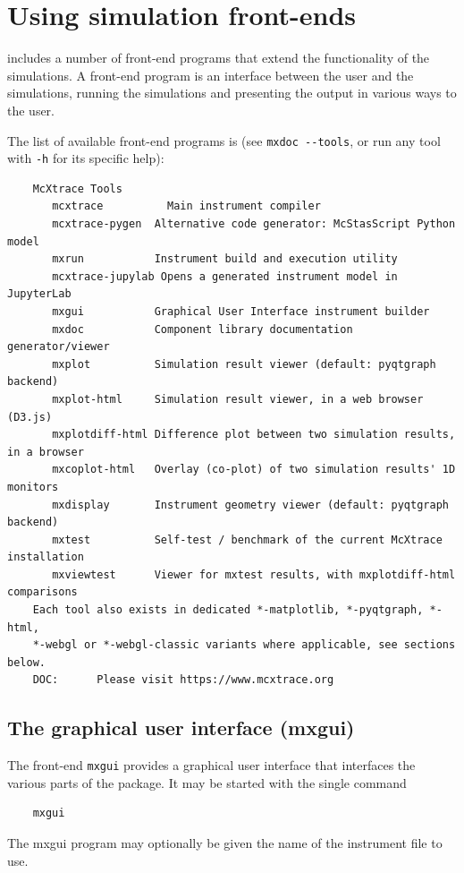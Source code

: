 \section{Using simulation front-ends}
\label{s:frontends}

\MCX includes a number of front-end programs that extend the
functionality of the simulations. A front-end program is an interface
between the user and the simulations, running the simulations and
presenting the output in various ways to the user.

The list of available \MCX front-end programs is (see \verb+mxdoc --tools+, or
run any tool with \verb+-h+ for its specific help):
\begin{lstlisting}
    McXtrace Tools
       mcxtrace          Main instrument compiler
       mcxtrace-pygen  Alternative code generator: McStasScript Python model
       mxrun           Instrument build and execution utility
       mcxtrace-jupylab Opens a generated instrument model in JupyterLab
       mxgui           Graphical User Interface instrument builder
       mxdoc           Component library documentation generator/viewer
       mxplot          Simulation result viewer (default: pyqtgraph backend)
       mxplot-html     Simulation result viewer, in a web browser (D3.js)
       mxplotdiff-html Difference plot between two simulation results, in a browser
       mxcoplot-html   Overlay (co-plot) of two simulation results' 1D monitors
       mxdisplay       Instrument geometry viewer (default: pyqtgraph backend)
       mxtest          Self-test / benchmark of the current McXtrace installation
       mxviewtest      Viewer for mxtest results, with mxplotdiff-html comparisons
    Each tool also exists in dedicated *-matplotlib, *-pyqtgraph, *-html,
    *-webgl or *-webgl-classic variants where applicable, see sections below.
    DOC:      Please visit https://www.mcxtrace.org
\end{lstlisting}

\subsection{The graphical user interface (mxgui)}
\label{s:mxgui}

The front-end \verb+mxgui+ provides a graphical user interface that interfaces
the various parts of the \MCX package. It may be started with the single
command
\begin{lstlisting}
    mxgui
\end{lstlisting}
The mxgui program may optionally be given the name of the
instrument file to use.

